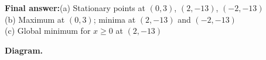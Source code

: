 \documentclass[11pt]{article}
\begin{document}
\begin{answerbox}
\textbf{Final answer:}\quad (a) Stationary points at \(\displaystyle  (0,3) \), \(\displaystyle  (2,-13) \), \(\displaystyle  (-2,-13) \) \\[3pt]  (b) Maximum at \(\displaystyle  (0,3) \); minima at \(\displaystyle  (2,-13) \) and \(\displaystyle  (-2,-13) \) \\[3pt]  (c) Global minimum for \(\displaystyle  x \geq 0 \) at \(\displaystyle  (2,-13) \)
\end{answerbox}
\textbf{Diagram.}

\begin{center}
\end{center}
\end{document}
